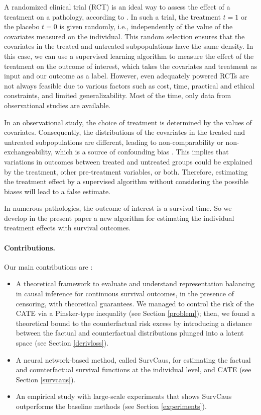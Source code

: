 \documentclass[12pt]{article}
\theoremstyle{plain}
\theoremstyle{definition}
\theoremstyle{remark}
\begin{document}
A randomized clinical trial (RCT) is an ideal way to assess the effect of a treatment on a pathology, according to \cite{Tricoci2009ScientificGuidelines}. In such a trial, the treatment $t=1$ or the placebo $t=0$ is given randomly, i.e., independently of the value of the covariates measured on the individual. This random selection ensures that the covariates in the treated and untreated subpopulations have the same density. In this case, we can use a supervised learning algorithm to measure the effect of the treatment on the outcome of interest, which takes the covariates and treatment as input and our outcome as a label. However, even adequately powered RCTs are not always feasible due to various factors such as cost, time, practical and ethical constraints, and limited generalizability. Most of the time, only data from observational studies are available. 

In an observational study, the choice of treatment is determined by the values of covariates. Consequently, the distributions of the covariates in the treated and untreated subpopulations are different, leading to non-comparability or non-exchangeability, which is a source of confounding bias \cite{Greenland2001ConfoundingIH}. This implies that variations in outcomes between treated and untreated groups could be explained by the treatment, other pre-treatment variables, or both. Therefore, estimating the treatment effect by a supervised algorithm without considering the possible biases will lead to a false estimate.

In numerous pathologies, the outcome of interest is a survival time. So we develop in the present paper a new algorithm for estimating the individual treatment effects with survival outcomes.

\paragraph{Contributions.} Our main contributions are :
\begin{itemize}
    \item A theoretical framework to evaluate and understand representation balancing in causal inference for continuous survival outcomes, in the presence of censoring, with theoretical guarantees. We managed to control the risk of the CATE via a Pinsker-type inequality (see Section \ref{problem}); then, we found a theoretical bound to the counterfactual risk excess by introducing a distance between the factual and counterfactual distributions plunged into a latent space (see Section \ref{derivloss}). 
    \item  A neural network-based method, called SurvCaus, for estimating the factual and counterfactual survival functions at the individual level, and CATE (see Section \ref{survcaus}). 
    \item An empirical study with large-scale experiments that shows SurvCaus outperforms the baseline methods (see Section \ref{experiments}).
\end{itemize}
\end{document}
